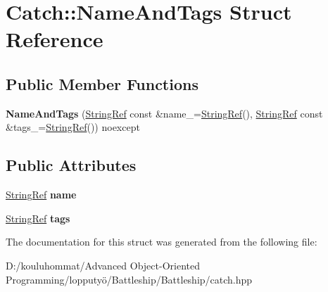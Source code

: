 \hypertarget{struct_catch_1_1_name_and_tags}{}\section{Catch\+:\+:Name\+And\+Tags Struct Reference}
\label{struct_catch_1_1_name_and_tags}
\subsection*{Public Member Functions}
\begin{DoxyCompactItemize}
\item 
\mbox{\label{struct_catch_1_1_name_and_tags_ab585111e615ce8c504a2b9630de8ee94}} 
{\bfseries Name\+And\+Tags} (\mbox{\hyperlink{class_catch_1_1_string_ref}{String\+Ref}} const \&name\+\_\+=\mbox{\hyperlink{class_catch_1_1_string_ref}{String\+Ref}}(), \mbox{\hyperlink{class_catch_1_1_string_ref}{String\+Ref}} const \&tags\+\_\+=\mbox{\hyperlink{class_catch_1_1_string_ref}{String\+Ref}}()) noexcept
\end{DoxyCompactItemize}
\subsection*{Public Attributes}
\begin{DoxyCompactItemize}
\item 
\mbox{\label{struct_catch_1_1_name_and_tags_a7cbea60e0cebfa622c667008eb011420}} 
\mbox{\hyperlink{class_catch_1_1_string_ref}{String\+Ref}} {\bfseries name}
\item 
\mbox{\label{struct_catch_1_1_name_and_tags_a74062ed1138834a348424eb7ed900c57}} 
\mbox{\hyperlink{class_catch_1_1_string_ref}{String\+Ref}} {\bfseries tags}
\end{DoxyCompactItemize}


The documentation for this struct was generated from the following file\+:\begin{DoxyCompactItemize}
\item 
D\+:/kouluhommat/\+Advanced Object-\/\+Oriented Programming/lopputyö/\+Battleship/\+Battleship/catch.\+hpp\end{DoxyCompactItemize}
